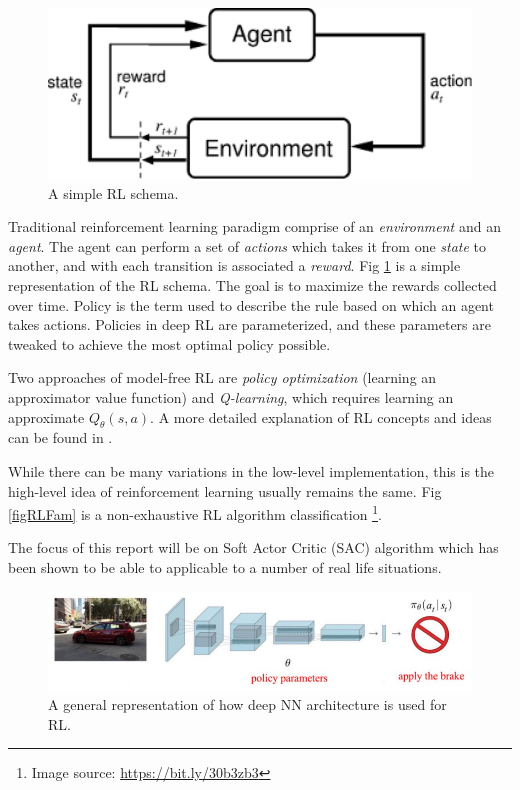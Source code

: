 \documentclass[conference]{IEEEtran}
\begin{document}
\begin{figure}[htbp]
\centerline{\includegraphics[scale=0.5]{img/simple_RL_schema.png}}
\caption{A simple RL schema.}
\label{figRL}
\end{figure}
Traditional reinforcement learning paradigm comprise of an \textit{environment} and an \textit{agent}. The agent can perform a set of \textit{actions} which takes it from one \textit{state} to another, and with each transition is associated a \textit{reward}. Fig \ref{figRL} is a simple representation of the RL schema. The goal is to maximize the rewards collected over time. Policy is the term used to describe the rule based on which an agent takes actions. Policies in deep RL are parameterized, and these parameters are tweaked to achieve the most optimal policy possible.

Two approaches of model-free RL are \textit{policy optimization} (learning an approximator value function) and \textit{Q-learning}, which requires learning an approximate $Q_{\theta}(s,a)$. A more detailed explanation of RL concepts and ideas can be found in \cite{Sutton:1998:IRL:551283}.

While there can be many variations in the low-level implementation, this is the high-level idea of reinforcement learning usually remains the same. Fig \ref{figRLFam} is a non-exhaustive RL algorithm classification \footnote{Image source: \url{https://bit.ly/30b3zb3}}.


The focus of this report will be on Soft Actor Critic (SAC) algorithm \cite{DBLP:journals/corr/abs-1801-01290} which has been shown to be able to applicable to a number of real life situations\cite{refSACapplication}. 

\begin{figure}[htbp]
\centerline{\includegraphics[width=\linewidth]{img/imgDeepRL.jpg}}
\caption{A general representation of how deep NN architecture is used for RL.}
\label{figDeepRL}
\end{figure}
\end{document}
